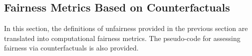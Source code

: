 \documentclass[letterpaper]{article} %
\begin{document}
\subsection{Fairness Metrics Based on Counterfactuals}

% 

In this section, the definitions of unfairness provided in the previous section are translated into computational fairness metrics. The pseudo-code for assessing fairness via counterfactuals is also provided.
\end{document}

